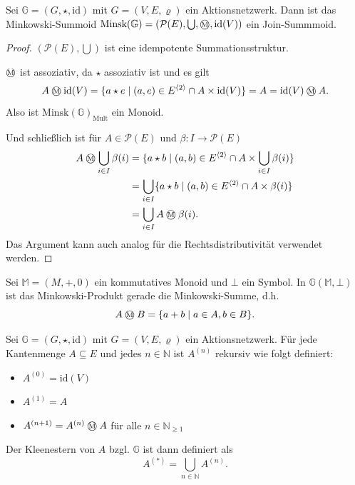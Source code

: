 \documentclass{article}
\newcommand{\mink}{\mathbin{
  \mathchoice
    {\mbox{\normalsize\textcircled{\scriptsize M}}}
    {\mbox{\normalsize\textcircled{\scriptsize M}}}
    {\mbox{\scriptsize\textcircled{\tiny M}}}
    {\mbox{\tiny\textcircled{\fontsize{3.5}{3.5}\selectfont M}}}
  }
}
\begin{document}
\begin{theorem}
  Sei $\mathbb{G} = (G, \star, \text{id})$ mit $G = (V, E, \varrho)$ ein Aktionsnetzwerk.
  Dann ist das Minkowski-Summoid $\text{Minsk}(\mathbb{G}) = (\mathcal{P}(E), \bigcup, \mink, \text{id}(V))$
  ein Join-Summmoid.
\end{theorem}
\begin{proof}
  $(\mathcal{P}(E), \bigcup)$ ist eine idempotente Summationsstruktur.
  
  $\mink$ ist assoziativ, da $\star$ assoziativ ist und es gilt
  \begin{equation*}
    A \mink \text{id}(V) 
    = \{a \star e \mid (a, e) \in E^{\langle 2 \rangle} \cap A \times \text{id}(V)\}
    = A
    = \text{id}(V) \mink A.
  \end{equation*}
  Also ist $\text{Minsk}(\mathbb{G})_\text{Mult}$ ein Monoid.

  Und schließlich ist für $A \in \mathcal{P}(E)$ und $\beta \colon I \to \mathcal{P}(E)$
  \begin{align*}
    A \mink \bigcup_{i \in I} \beta(i)
    &= \{a \star b \mid (a, b) \in E^{\langle 2 \rangle} \cap A \times \bigcup_{i \in I} \beta(i)\} \\
    &= \bigcup_{i \in I} \{a \star b \mid (a, b) \in E^{\langle 2 \rangle} \cap A \times \beta(i)\} \\
    &= \bigcup_{i \in I} A \mink \beta(i).
  \end{align*}
  Das Argument kann auch analog für die Rechtsdistributivität verwendet werden.
\end{proof}

\begin{example}
  Sei $\mathbb{M} = (M, +, 0)$ ein kommutatives Monoid
  und $\bot$ ein Symbol.
  In $\mathbb{G}(\mathbb{M}, \bot)$ ist das Minkowski-Produkt gerade die Minkowski-Summe,
  d.h.
  \begin{equation*}
    A \mink B = \{a + b \mid a \in A, b \in B\}.
  \end{equation*}
\end{example}

\begin{definition}
  Sei $\mathbb{G} = (G, \star, \text{id})$ mit $G = (V, E, \varrho)$ ein Aktionsnetzwerk.
  Für jede Kantenmenge $A \subseteq E$ und jedes $n \in \mathbb{N}$ ist $A^{(n)}$ rekursiv wie folgt definiert:
  \begin{itemize}
    \item $A^{(0)} = \text{id}(V)$
    \item $A^{(1)} = A$
    \item $A^{(n + 1)} = A^{(n)} \mink A$ für alle $n \in \mathbb{N}_{\geq 1}$
  \end{itemize}
  Der Kleenestern von $A$ bzgl. $\mathbb{G}$ ist dann definiert als
  \begin{equation*}
    A^{(\ast)} = \bigcup_{n \in \mathbb{N}} A^{(n)}.
  \end{equation*}
\end{definition}
\end{document}
